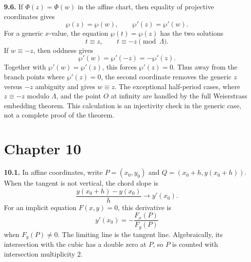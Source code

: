 \textbf{9.6.} If \(\Phi(z)=\Phi(w)\) in the affine chart, then equality of
projective coordinates gives
\[
  \wp(z)=\wp(w),\qquad \wp'(z)=\wp'(w).
\]
For a generic \(x\)-value, the equation \(\wp(t)=\wp(z)\) has the two solutions
\[
  t\equiv z,\qquad t\equiv -z \pmod{\Lambda}.
\]
If \(w\equiv -z\), then oddness gives
\[
  \wp'(w)=\wp'(-z)=-\wp'(z).
\]
Together with \(\wp'(w)=\wp'(z)\), this forces \(\wp'(z)=0\).  Thus away from
the branch points where \(\wp'(z)=0\), the second coordinate removes the
generic \(z\) versus \(-z\) ambiguity and gives \(w\equiv z\).  The exceptional
half-period cases, where \(z\equiv -z\) modulo \(\Lambda\), and the point
\(O\) at infinity are handled by the full Weierstrass embedding theorem.  This
calculation is an injectivity check in the generic case, not a complete proof of
the theorem.

\begin{center}
\end{center}

\section{Chapter 10}

\textbf{10.1.} In affine coordinates, write \(P=(x_0,y_0)\) and
\(Q=(x_0+h,y(x_0+h))\).  When the tangent is not vertical, the chord slope is
\[
  \frac{y(x_0+h)-y(x_0)}{h}\longrightarrow y'(x_0).
\]
For an implicit equation \(F(x,y)=0\), this derivative is
\[
  y'(x_0)=-\frac{F_x(P)}{F_y(P)}
\]
when \(F_y(P)\ne0\).  The limiting line is the tangent line.  Algebraically, its
intersection with the cubic has a double zero at \(P\), so \(P\) is counted with
intersection multiplicity \(2\).

